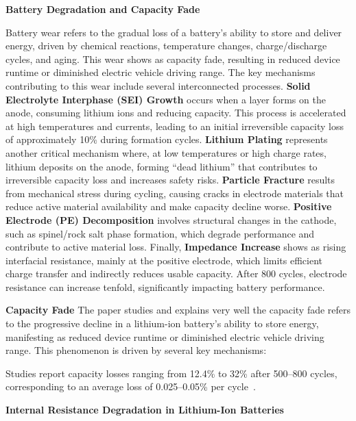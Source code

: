 \vspace{1cm}
\textbf{Battery Degradation and Capacity Fade}
\label{sec:degradation}

Battery wear refers to the gradual loss of a battery's ability to store and deliver energy, driven by chemical reactions, temperature changes, charge/discharge cycles, and aging. This wear shows as capacity fade, resulting in reduced device runtime or diminished electric vehicle driving range. The key mechanisms contributing to this wear include several interconnected processes. \textbf{Solid Electrolyte Interphase (SEI) Growth} occurs when a layer forms on the anode, consuming lithium ions and reducing capacity. This process is accelerated at high temperatures and currents, leading to an initial irreversible capacity loss of approximately 10\% during formation cycles. \textbf{Lithium Plating} represents another critical mechanism where, at low temperatures or high charge rates, lithium deposits on the anode, forming ``dead lithium'' that contributes to irreversible capacity loss and increases safety risks. \textbf{Particle Fracture} results from mechanical stress during cycling, causing cracks in electrode materials that reduce active material availability and make capacity decline worse. \textbf{Positive Electrode (PE) Decomposition} involves structural changes in the cathode, such as spinel/rock salt phase formation, which degrade performance and contribute to active material loss. Finally, \textbf{Impedance Increase} shows as rising interfacial resistance, mainly at the positive electrode, which limits efficient charge transfer and indirectly reduces usable capacity. After 800 cycles, electrode resistance can increase tenfold, significantly impacting battery performance.

\vspace{1cm}
\textbf{Capacity Fade}
The \cite{zhang_studies_2000} paper studies and explains very well the capacity fade refers to the progressive decline in a lithium-ion battery’s ability to store energy, manifesting as reduced device runtime or diminished electric vehicle driving range. This phenomenon is driven by several key mechanisms:

Studies report capacity losses ranging from 12.4\% to 32\% after 500--800 cycles, corresponding to an average loss of 0.025--0.05\% per cycle~\cite{zhang_studies_2000}.

\textbf{Internal Resistance Degradation in Lithium-Ion Batteries}

